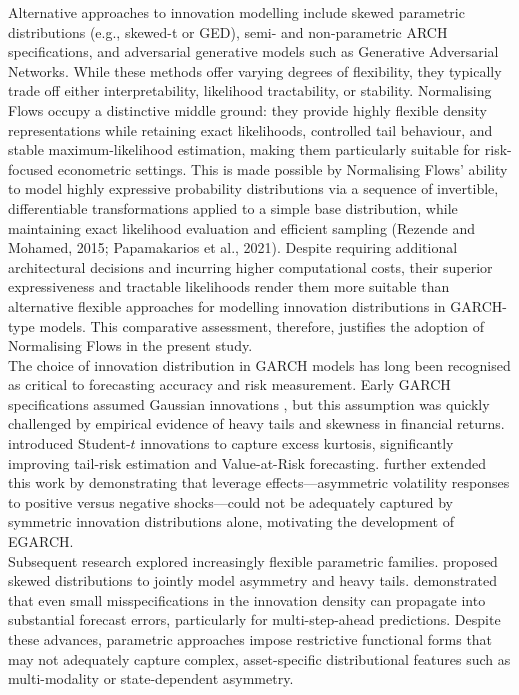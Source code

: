 \documentclass[oneside,12pt]{CUEDthesisPSnPDF}
\newcommand{\textcite}{\citet}
\newcommand{\parencite}{\citep}
\begin{document}
Alternative approaches to innovation modelling include skewed parametric distributions (e.g., skewed-t or GED), semi- and non-parametric ARCH specifications, and adversarial generative models such as Generative Adversarial Networks. While these methods offer varying degrees of flexibility, they typically trade off either interpretability, likelihood tractability, or stability. Normalising Flows occupy a distinctive middle ground: they provide highly flexible density representations while retaining exact likelihoods, controlled tail behaviour, and stable maximum-likelihood estimation, making them particularly suitable for risk-focused econometric settings. This is made possible by Normalising Flows' ability to model highly expressive probability distributions via a sequence of invertible, differentiable transformations applied to a simple base distribution, while maintaining exact likelihood evaluation and efficient sampling (Rezende and Mohamed, 2015; Papamakarios et al., 2021). Despite requiring additional architectural decisions and incurring higher computational costs, their superior expressiveness and tractable likelihoods render them more suitable than alternative flexible approaches for modelling innovation distributions in GARCH-type models. This comparative assessment, therefore, justifies the adoption of Normalising Flows in the present study.\\

The choice of innovation distribution in GARCH models has long been recognised as critical to forecasting accuracy and risk measurement. Early GARCH specifications assumed Gaussian innovations \parencite{bollerslev1986generalised}, but this assumption was quickly challenged by empirical evidence of heavy tails and skewness in financial returns. \textcite{bollerslev1987conditionally} introduced Student-$t$ innovations to capture excess kurtosis, significantly improving tail-risk estimation and Value-at-Risk forecasting. \textcite{nelson1991conditional} further extended this work by demonstrating that leverage effects—asymmetric volatility responses to positive versus negative shocks—could not be adequately captured by symmetric innovation distributions alone, motivating the development of EGARCH.\\

Subsequent research explored increasingly flexible parametric families. \textcite{fernandez1998multivariate} proposed skewed distributions to jointly model asymmetry and heavy tails. \textcite{hansen1994autoregressive} demonstrated that even small misspecifications in the innovation density can propagate into substantial forecast errors, particularly for multi-step-ahead predictions. Despite these advances, parametric approaches impose restrictive functional forms that may not adequately capture complex, asset-specific distributional features such as multi-modality or state-dependent asymmetry.\\
\end{document}
